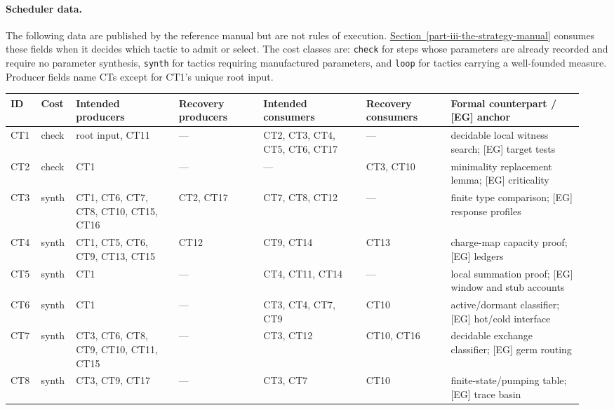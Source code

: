 \documentclass[
  11pt,
]{article}
\theoremstyle{definition}
\newcommand{\secref}[1]{\hyperref[#1]{Section~\ref*{#1}}}
\begin{document}
\paragraph{Scheduler data.}
The following data are published by the reference manual but are not
rules of execution. \secref{part-iii-the-strategy-manual} consumes these fields when it decides which
tactic to admit or select. The cost classes are: \texttt{check} for
steps whose parameters are already recorded and require no parameter
synthesis, \texttt{synth} for tactics
requiring manufactured parameters, and \texttt{loop} for tactics carrying
a well-founded measure. Producer fields name CTs except for CT1's unique
root input.

\begingroup
\tiny
\setlength{\tabcolsep}{0.7pt}
\begin{longtable}[]{@{}
  >{\raggedright\arraybackslash}p{0.055\linewidth}
  >{\raggedright\arraybackslash}p{0.055\linewidth}
  >{\raggedright\arraybackslash}p{0.17\linewidth}
  >{\raggedright\arraybackslash}p{0.14\linewidth}
  >{\raggedright\arraybackslash}p{0.17\linewidth}
  >{\raggedright\arraybackslash}p{0.14\linewidth}
  >{\raggedright\arraybackslash}p{0.22\linewidth}@{}}
\toprule\noalign{}
ID & Cost & Intended producers & Recovery producers & Intended consumers & Recovery consumers & Formal counterpart / [EG] anchor \\
\midrule\noalign{}
\endhead
\bottomrule\noalign{}
\endlastfoot
CT1 & check & root input, CT11 & --- & CT2, CT3, CT4, CT5, CT6, CT17 & --- & decidable local witness search; [EG] target tests \\
CT2 & check & CT1 & --- & --- & CT3, CT10 & minimality replacement lemma; [EG] criticality \\
CT3 & synth & CT1, CT6, CT7, CT8, CT10, CT15, CT16 & CT2, CT17 & CT7, CT8, CT12 & --- & finite type comparison; [EG] response profiles \\
CT4 & synth & CT1, CT5, CT6, CT9, CT13, CT15 & CT12 & CT9, CT14 & CT13 & charge-map capacity proof; [EG] ledgers \\
CT5 & synth & CT1 & --- & CT4, CT11, CT14 & --- & local summation proof; [EG] window and stub accounts \\
CT6 & synth & CT1 & --- & CT3, CT4, CT7, CT9 & CT10 & active/dormant classifier; [EG] hot/cold interface \\
CT7 & synth & CT3, CT6, CT8, CT9, CT10, CT11, CT15 & --- & CT3, CT12 & CT10, CT16 & decidable exchange classifier; [EG] germ routing \\
CT8 & synth & CT3, CT9, CT17 & --- & CT3, CT7 & CT10 & finite-state/pumping table; [EG] trace basin \\

\end{longtable}
\end{document}
